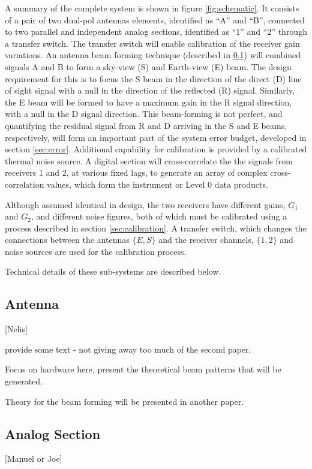 \documentclass[draftcls,onecolumn]{IEEEtran}  %
\begin{document}
A summary of the complete system is shown in figure \ref{fig:schematic}.  It consists of a pair of two dual-pol antennas elements, identified as ``A'' and ``B'', connected to two parallel and independent analog sections, identified as ``1'' and ``2''  through a transfer switch.  The transfer switch will enable calibration of the receiver gain variations.  An antenna beam forming technique (described in \ref{sec:antenna}) will combined signals A and B to form a sky-view (S) and Earth-view (E) beam.  
The design requirement for this is to focus the S beam in the direction of the direct (D) line of sight signal with a null in the direction of the reflected (R) signal. 
Similarly, the E beam will be formed to have a maximum gain in the R signal direction, with a null in the D signal direction.
This beam-forming is not perfect, and quantifying the residual signal from R and D arriving in the S and E beams, respectively, will form an important part of the system error budget, developed in section \ref{sec:error}. 
Additional capability for calibration is provided by a calibrated thermal noise source.
A digital section will cross-correlate the the signals from receivers 1 and 2, at various fixed lags, to generate an array of complex cross-correlation values, which form the instrument or Level 0 data products.


Although assumed identical in design, the two receivers have different gains, $G_1$ and $G_2$, and different noise figures, both of which must be calibrated using a process described in section \ref{sec:calibration}.  
A transfer switch, which changes the connections between the antennas $\{ E, S \}$ and the receiver channels, $\{ 1, 2\}$ and noise sources are used for the calibration process. 


Technical details of these sub-systems are described below. 

\subsection{Antenna}
\label{sec:antenna}
[Nelis]

provide some text - not giving away too much of the second paper. 

Focus on hardware here, present the theoretical beam patterns that will be generated.  

Theory for the beam forming will be presented in another paper. 

\subsection{Analog Section}
\label{sec:analog}
[Manuel or Joe]
\end{document}

